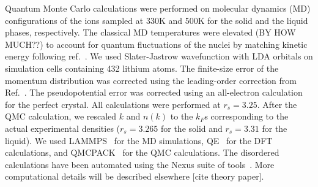 \documentclass[twocolumn,showpacs,showkeys,fleqn,prl,superscriptaddress]{revtex4}%
\begin{document}
Quantum Monte Carlo calculations were performed on molecular dynamics (MD) configurations of the ions sampled at 330K and 500K for the solid and the liquid phases, respectively. The classical MD temperatures were elevated (BY HOW MUCH??) to account for quantum fluctuations of the nuclei by matching kinetic energy following ref.~\cite{filippi98}. We used Slater-Jastrow wavefunction with LDA orbitals on simulation cells containing 432 lithium atoms. The finite-size error of the momentum distribution was corrected using the leading-order correction from Ref.~\cite{holz09}. The pseudopotential error was corrected using an all-electron calculation for the perfect crystal. All calculations were performed at $r_s=3.25$. After the QMC calculation, we rescaled $k$ and $n(k)$ to the $k_F$s corresponding to the actual experimental densities ($r_s=3.265$ for the solid and $r_s=3.31$ for the liquid). We used LAMMPS~\cite{Plimpton1993} for the MD simulations, QE~\cite{Giannozzi2009,Enkovaara2017} for the DFT calculations, and QMCPACK~\cite{Kim2018} for the QMC calculations. The disordered calculations have been automated using the Nexus suite of tools~\cite{Krogel2016}.
More computational details will be described elsewhere [cite theory paper].
\end{document}
